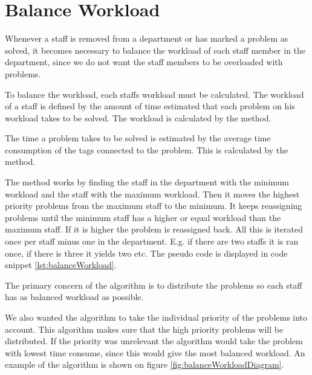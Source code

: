 \section{Balance Workload}
Whenever a staff is removed from a department or has marked a problem as solved, 
it becomes necessary to balance the workload of each staff member in the department, since we do not want the staff members to be overloaded with problems. 

To balance the workload, each staffs workload must be calculated. 
The workload of a staff is defined by the amount of time estimated that each problem on his workload takes to be solved. 
The workload is calculated by the  method.

The time a problem takes to be solved is estimated by the average time consumption of the tags connected to the problem. 
This is calculated by the  method.

The  method works by finding the staff in the department with the minimum workload and the staff with the maximum workload. Then it moves the highest priority problems from the maximum staff to the minimum. 
It keeps reassigning problems until the minimum staff has a higher or equal workload than the maximum staff. If it is higher the problem is reassigned back. 
All this is iterated once per staff minus one in the department. 
E.g. if there are two staffs it is ran once, if there is three it yields two etc. 
The pseudo code is displayed in code snippet \ref{lst:balanceWorkload}.

The primary concern of the algorithm is to distribute the problems so each staff has as balanced workload as possible.

 


We also wanted the algorithm to take the individual priority of the problems into account. 
This algorithm makes sure that the high priority problems will be distributed. 
If the priority was unrelevant the algorithm would take the problem with lowest time consume, since this would give the most balanced workload. 
An example of the algorithm is shown on figure \ref{fig:balanceWorkloadDiagram}. 

